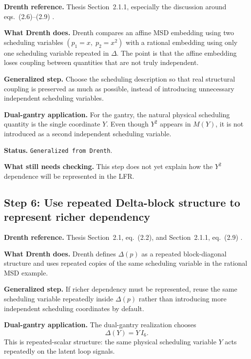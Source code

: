 \documentclass[11pt]{article}
\newcommand{\audititem}[2]{\par\smallskip\noindent\textbf{#1.} #2\par}
\newcommand{\statusline}[1]{\texttt{#1}}
\begin{document}
\audititem{Drenth reference}{Thesis Section~2.1.1, especially the discussion
around eqs.~(2.6)--(2.9) \cite{drenth2025thesis}.}

\audititem{What Drenth does}{Drenth compares an affine MSD embedding using two
scheduling variables $(p_1=x,\; p_2=x^2)$ with a rational embedding using only
one scheduling variable repeated in $\Delta$. The point is that the affine
embedding loses coupling between quantities that are not truly independent.}

\audititem{Generalized step}{Choose the scheduling description so that real
structural coupling is preserved as much as possible, instead of introducing
unnecessary independent scheduling variables.}

\audititem{Dual-gantry application}{For the gantry, the natural physical
scheduling quantity is the single coordinate $Y$. Even though $Y^2$ appears in
$M(Y)$, it is not introduced as a second independent scheduling variable.}

\audititem{Status}{\statusline{Generalized from Drenth}.}

\audititem{What still needs checking}{This step does not yet explain how the
$Y^2$ dependence will be represented in the LFR.}

\subsection{Step 6: Use repeated Delta-block structure to represent richer dependency}

\audititem{Drenth reference}{Thesis Section~2.1, eq.~(2.2), and Section~2.1.1,
eq.~(2.9) \cite{drenth2025thesis}.}

\audititem{What Drenth does}{Drenth defines $\Delta(p)$ as a repeated
block-diagonal structure and uses repeated copies of the same scheduling
variable in the rational MSD example.}

\audititem{Generalized step}{If richer dependency must be represented, reuse the
same scheduling variable repeatedly inside $\Delta(p)$ rather than introducing
more independent scheduling coordinates by default.}

\audititem{Dual-gantry application}{The dual-gantry realization chooses
\begin{equation}
    \Delta(Y) = Y\,I_6.
    \label{eqv:Delta}
\end{equation}
This is repeated-scalar structure: the same physical scheduling variable $Y$
acts repeatedly on the latent loop signals.}
\end{document}
